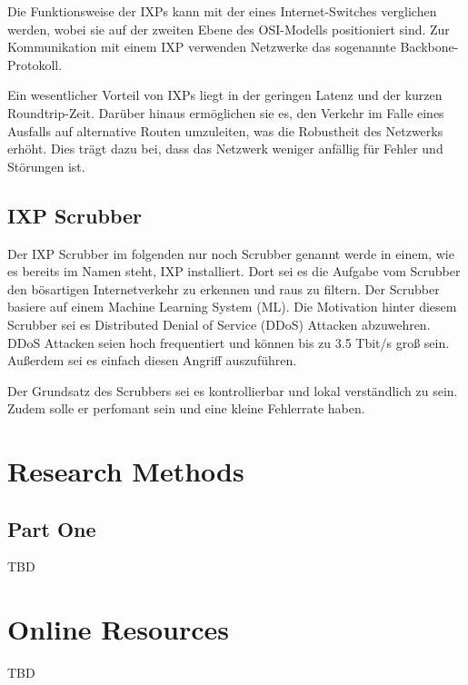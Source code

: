 \documentclass[sigplan,screen]{acmart}
\begin{document}
Die Funktionsweise der IXPs kann mit der eines Internet-Switches verglichen werden, wobei sie auf der zweiten Ebene des OSI-Modells positioniert sind. Zur Kommunikation mit einem IXP verwenden Netzwerke das sogenannte Backbone-Protokoll.

Ein wesentlicher Vorteil von IXPs liegt in der geringen Latenz und der kurzen Roundtrip-Zeit. Darüber hinaus ermöglichen sie es, den Verkehr im Falle eines Ausfalls auf alternative Routen umzuleiten, was die Robustheit des Netzwerks erhöht. Dies trägt dazu bei, dass das Netzwerk weniger anfällig für Fehler und Störungen ist. \cite{Cloudflare01}

\subsection{IXP Scrubber}
Der IXP Scrubber im folgenden nur noch Scrubber genannt werde in einem, wie es bereits im Namen steht, IXP installiert. Dort sei es die Aufgabe vom Scrubber den bösartigen Internetverkehr zu erkennen und raus zu filtern. Der Scrubber basiere auf einem Machine Learning System (ML). Die Motivation hinter diesem Scrubber sei es Distributed Denial of Service (DDoS) Attacken abzuwehren. DDoS Attacken seien hoch frequentiert und können bis zu 3.5 Tbit/s groß sein. Außerdem sei es einfach diesen Angriff auszuführen.

Der Grundsatz des Scrubbers sei es kontrollierbar und lokal verständlich zu sein. Zudem solle er perfomant sein und eine kleine Fehlerrate haben. 
\cite{Hohlfeld01}



\appendix

\section{Research Methods}

\subsection{Part One}

TBD


\section{Online Resources}

TBD
\end{document}
